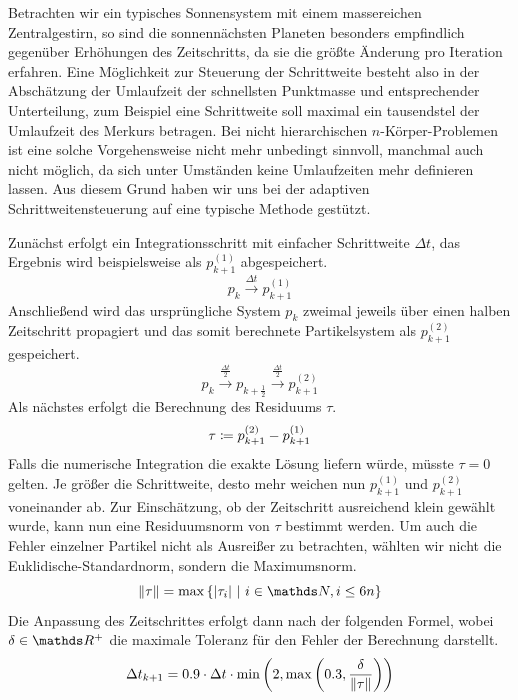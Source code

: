     Betrachten wir ein typisches Sonnensystem mit einem massereichen Zentralgestirn, so sind die sonnennächsten Planeten besonders empfindlich gegenüber Erhöhungen des Zeitschritts, da sie die größte Änderung pro Iteration erfahren.
    Eine Möglichkeit zur Steuerung der Schrittweite besteht also in der Abschätzung der Umlaufzeit der schnellsten Punktmasse und entsprechender Unterteilung, zum Beispiel eine Schrittweite soll maximal ein tausendstel der Umlaufzeit des Merkurs betragen.
    Bei nicht hierarchischen $n$-Körper-Problemen ist eine solche Vorgehensweise nicht mehr unbedingt sinnvoll, manchmal auch nicht möglich, da sich unter Umständen keine Umlaufzeiten mehr definieren lassen.
    Aus diesem Grund haben wir uns bei der adaptiven Schrittweitensteuerung auf eine typische Methode gestützt.

    Zunächst erfolgt ein Integrationsschritt mit einfacher Schrittweite $\Delta t$, das Ergebnis wird beispielsweise als $p_{k+1}^{(1)}$ abgespeichert.
    \[
      p_k \xrightarrow{\Delta t} p_{k+1}^{(1)}
    \]
    Anschließend wird das ursprüngliche System $p_k$ zweimal jeweils über einen halben Zeitschritt propagiert und das somit berechnete Partikelsystem als $p_{k+1}^{(2)}$ gespeichert.
    \[
      p_k \xrightarrow{\frac{\Delta t}{2}} p_{k+\frac{1}{2}} \xrightarrow{\frac{\Delta t}{2}} p_{k+1}^{(2)}
    \]
    Als nächstes erfolgt die Berechnung des Residuums $\tau$.
    \[
      \tau \coloneqq p_{k+1}^{(2)} - p_{k+1}^{(1)}
    \]
    Falls die numerische Integration die exakte Lösung liefern würde, müsste $\tau = 0$ gelten.
    Je größer die Schrittweite, desto mehr weichen nun $p_{k+1}^{(1)}$ und $p_{k+1}^{(2)}$ voneinander ab.
    Zur Einschätzung, ob der Zeitschritt ausreichend klein gewählt wurde, kann nun eine Residuumsnorm von $\tau$ bestimmt werden.
    Um auch die Fehler einzelner Partikel nicht als Ausreißer zu betrachten, wählten wir nicht die Euklidische-Standardnorm, sondern die Maximumsnorm.
    \[
      \norm{\tau} = \max\left\{\abs{\tau_i} \ \middle| \ i\in\setNatural,i\leq 6n \right\}
    \]
    Die Anpassung des Zeitschrittes erfolgt dann nach der folgenden Formel, wobei $\delta\in\setReal^+$ die maximale Toleranz für den Fehler der Berechnung darstellt.
    \[
      \Delta t_{k+1} = 0.9\cdot\Delta t\cdot \min\left(2,\max\left(0.3, \frac{\delta}{\|\tau\|}\right)\right)
    \]
    \medskip
    \begin{tcolorbox}[colframe=black,colbacktitle=white,coltitle=black, attach boxed title to top center={yshift=-2mm},enhanced, titlerule=0.1pt, boxrule=0.5pt, arc=5pt,title=Quelltext:\quad Adaptiver-Integrator, breakable]
      
    \end{tcolorbox}


